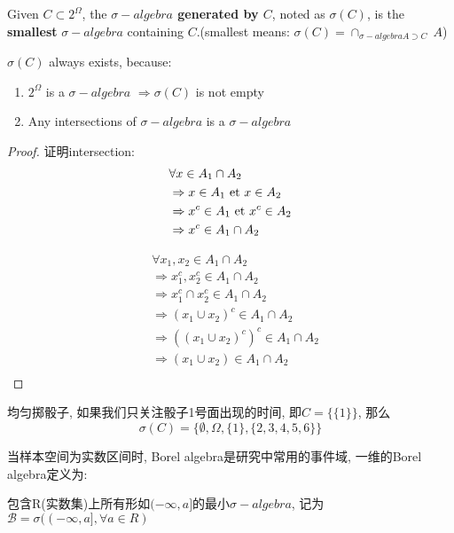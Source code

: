 \documentclass{article}
\begin{document}
\begin{definition}
Given $C \subset 2^{\Omega}$, the \textbf{$\sigma-algebra$ generated by $C$}, noted as $\sigma(C)$, is the \textbf{smallest} $\sigma-algebra$ containing $C$.(smallest means: $\sigma(C) = \cap_{\sigma-algebra A \supset C}\ A$)
\end{definition}

$\sigma(C)$ always exists, because:
\begin{enumerate}
\item $2^{\Omega}$ is a $\sigma-algebra$ $\Rightarrow \sigma(C)$ is not empty
\item Any intersections of $\sigma-algebra$ is a $\sigma-algebra$
\end{enumerate}
\begin{proof}
证明intersection:\\
$$
\begin{aligned}
& \forall x \in A_1 \cap A_2\\
& \Rightarrow x \in A_1  \textrm{\ et } x \in A_2\\
& \Rightarrow x^c \in A_1 \textrm{\ et } x^c \in A_2\\
& \Rightarrow x^c \in A_1 \cap A_2\\
\end{aligned}
$$

$$
\begin{aligned}
& \forall x_1, x_2 \in A_1 \cap A_2\\
& \Rightarrow x_1^c, x_2^c \in A_1 \cap A_2\\
& \Rightarrow x_1^c \cap x_2^c \in A_1 \cap A_2\\
& \Rightarrow (x_1 \cup x_2)^c \in A_1 \cap A_2\\
& \Rightarrow ((x_1 \cup x_2)^c)^c \in A_1 \cap A_2\\
& \Rightarrow (x_1 \cup x_2) \in A_1 \cap A_2\\
\end{aligned}
$$
\end{proof}

\begin{example}
均匀掷骰子, 如果我们只关注骰子1号面出现的时间, 即$C= \{\{1\}\}$, 那么
$$\sigma(C) = \{ \emptyset, \Omega, \{1\}, \{2,3,4,5,6\} \}$$
\end{example}

\begin{example}
当样本空间为实数区间时, Borel algebra是研究中常用的事件域, 一维的Borel algebra定义为:
\begin{definition}
包含R(实数集)上所有形如$(-\infty, a]$的最小$\sigma-algebra$, 记为$\mathcal{B} = \sigma((-\infty, a], \forall a \in R)$
\end{definition}
\end{example}
\end{document}
